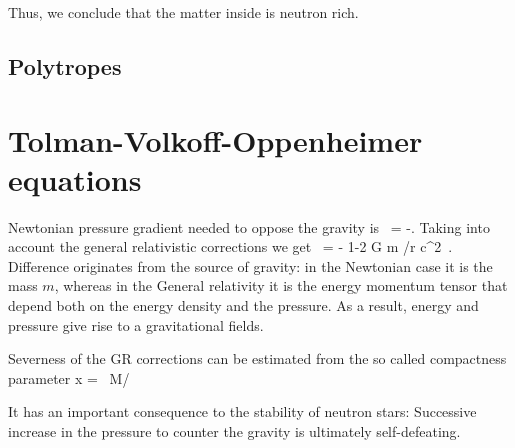 Thus, we conclude that the matter inside is neutron rich.


\subsection{Polytropes}



\section{Tolman-Volkoff-Oppenheimer equations}
Newtonian pressure gradient needed to oppose the gravity is
\be
{} = -.
\ee
Taking into account the general relativistic corrections we get
\be
{} = 
    - \times 
    {1-2 G m /r c^2 }.
\ee
Difference originates from the source of gravity:
in the Newtonian case it is the mass $m$, whereas in the General relativity it is the energy momentum tensor that depend both on the energy density and the pressure.
As a result, energy and pressure give rise to a gravitational fields.

Severness of the GR corrections can be estimated from the so called compactness parameter
\be
x =  ~M/\Msun \km
\ee


It has an important consequence to the stability of neutron stars:
Successive increase in the pressure to counter the gravity is ultimately self-defeating.










